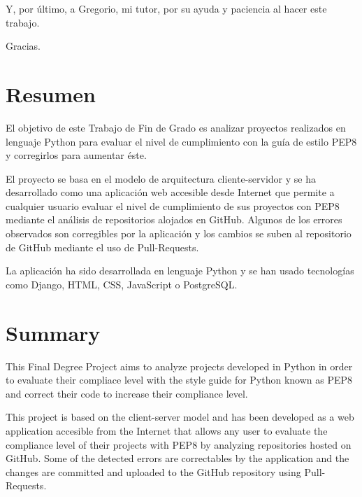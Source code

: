 \documentclass[a4paper, 12pt]{book}
\begin{document}
Y, por último, a Gregorio, mi tutor, por su ayuda y paciencia al hacer este trabajo.

Gracias.

\chapter*{Resumen}

El objetivo de este Trabajo de Fin de Grado es analizar proyectos realizados en lenguaje Python para evaluar el nivel de cumplimiento con la guía de estilo PEP8 y corregirlos para aumentar éste.

El proyecto se basa en el modelo de arquitectura cliente-servidor y se ha desarrollado como una aplicación web accesible desde Internet que permite a cualquier usuario evaluar el nivel de cumplimiento de sus proyectos con PEP8 mediante el análisis de repositorios alojados en GitHub.
Algunos de los errores observados son corregibles por la aplicación y los cambios se suben al repositorio de GitHub mediante el uso de Pull-Requests.

La aplicación ha sido desarrollada en lenguaje Python y se han usado tecnologías como Django, HTML, CSS, JavaScript o PostgreSQL.


\chapter*{Summary}
This Final Degree Project aims to analyze projects developed in Python in order to evaluate their compliace level with the style guide for Python known as PEP8 and correct their code to increase their compliance level.

This project is based on the client-server model and has been developed as a web application accesible from the Internet that allows any user to evaluate the compliance level of their projects with PEP8 by analyzing repositories hosted on GitHub.
Some of the detected errors are correctables by the application and the changes are committed and uploaded to the GitHub repository using Pull-Requests.
\end{document}
